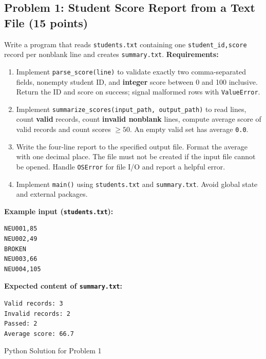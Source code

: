 \documentclass[11pt,a4paper]{article}
\begin{document}
\subsection*{Problem 1: Student Score Report from a Text File (15 points)}
Write a program that reads \texttt{students.txt} containing one \texttt{student\_id,score} record per nonblank line and creates \texttt{summary.txt}.
\textbf{Requirements:}
\begin{enumerate}[label=\arabic*.,leftmargin=2em,itemsep=2pt]
\item Implement \texttt{parse\_score(line)} to validate exactly two comma-separated fields, nonempty student ID, and \textbf{integer} score between 0 and 100 inclusive. Return the ID and score on success; signal malformed rows with \texttt{ValueError}.
\item Implement \texttt{summarize\_scores(input\_path, output\_path)} to read lines, count \textbf{valid} records, count \textbf{invalid nonblank} lines, compute average score of valid records and count scores $\ge 50$. An empty valid set has average \texttt{0.0}.
\item Write the four-line report to the specified output file. Format the average with one decimal place. The file must not be created if the input file cannot be opened. Handle \texttt{OSError} for file I/O and report a helpful error.
\item Implement \texttt{main()} using \texttt{students.txt} and \texttt{summary.txt}. Avoid global state and external packages.
\end{enumerate}
\textbf{Example input (\texttt{students.txt}):}
\begin{lstlisting}
NEU001,85
NEU002,49
BROKEN
NEU003,66
NEU004,105
\end{lstlisting}
\textbf{Expected content of \texttt{summary.txt}:}
\begin{lstlisting}
Valid records: 3
Invalid records: 2
Passed: 2
Average score: 66.7
\end{lstlisting}
\begin{answerbox}[height=8.0cm]{Python Solution for Problem 1}\end{answerbox}
\newpage
\end{document}
